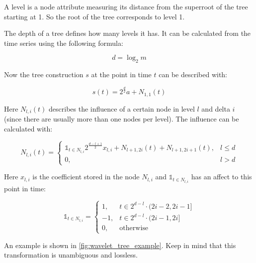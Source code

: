 \begin{definition}
    A level is a node attribute measuring its distance from the superroot of the tree starting at \num{1}. So the root of the tree corresponds to level \num{1}.

    The depth of a tree defines how many levels it has. It can be calculated from the time series using the following formula:

    \begin{equation}\label{eq:d}
        d = \log_2 m
    \end{equation}
\end{definition}

Now the tree construction $s$ at the point in time $t$ can be described with:

\begin{equation}\label{eq:tree}
    s(t) = 2^\frac{d}{2} a + N_{1,1}(t)
\end{equation}

Here $N_{l, i}(t)$ describes the influence of a certain node in level $l$ and delta $i$ (since there are usually more than one nodes per level). The influence can be calculated with:

\begin{equation}\label{eq:node}
    N_{l, i}(t) = \begin{cases}
        \mathbb{1}_{t \in N_{l, i}} 2^\frac{d - l + 1}{2} x_{l, i} + N_{l + 1, 2i}(t) + N_{l + 1, 2i + 1}(t), & l \leq d \\
        0, & l > d
    \end{cases}
\end{equation}

Here $x_{l, i}$ is the coefficient stored in the node $N_{l, i}$ and $\mathbb{1}_{t \in N_{l, i}}$ has an affect to this point in time:

\begin{equation}\label{eq:matches}
    \mathbb{1}_{t \in N_{l, i}} = \begin{cases}
        1, & t \in 2^{d - l} \cdot (2i - 2, 2i - 1 ] \\
        -1, & t \in 2^{d - l} \cdot (2i - 1, 2i ] \\
        0, & \text{otherwise}
    \end{cases}
\end{equation}

An example is shown in \autoref{fig:wavelet_tree_example}. Keep in mind that this transformation is unambiguous and lossless.

